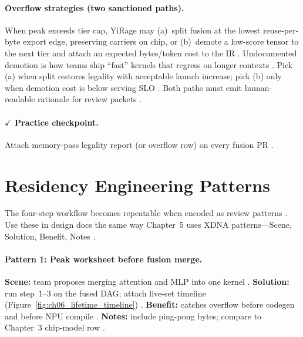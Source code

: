 \paragraph{Overflow strategies (two sanctioned paths).}
When peak exceeds tier cap, YiRage may (a)~split fusion at the lowest reuse-per-byte export edge, preserving carriers on chip, or (b)~demote a low-score tensor to the next tier and attach an expected bytes/token cost to the IR \citep{yirage2026,chen2020compilerbasedhardw}.
Undocumented demotion is how teams ship ``fast'' kernels that regress on longer contexts \citep{patel2025llminference,memoryfloor2026}.
Pick (a) when split restores legality with acceptable launch increase; pick (b) only when demotion cost is below serving SLO \citep{taxbreak2026,wu2024mirage}.
Both paths must emit human-readable rationale for review packets \citep{yirage2026,chen2020compilerbasedhardw}.

\paragraph{$\checkmark$ Practice checkpoint.}
Attach memory-pass legality report (or overflow row) on every fusion PR \citep{yirage2026,chen2020compilerbasedhardw}.

\section{Residency Engineering Patterns}
\label{sec:ch06_residency_patterns}

The four-step workflow becomes repeatable when encoded as review patterns \citep{chen2020compilerbasedhardw,yirage2026}.
Use these in design docs the same way Chapter~5 uses XDNA patterns---Scene, Solution, Benefit, Notes \citep{patel2025llminference,amd2024aie}.

\paragraph{Pattern 1: Peak worksheet before fusion merge.}
\textbf{Scene:} team proposes merging attention and MLP into one kernel \citep{taxbreak2026}.
\textbf{Solution:} run step~1--3 on the fused DAG; attach live-set timeline (Figure~\ref{fig:ch06_lifetime_timeline}) \citep{wu2024mirage,dlbook}.
\textbf{Benefit:} catches overflow before codegen and before NPU compile \citep{yirage2026,amd2024xdna}.
\textbf{Notes:} include ping-pong bytes; compare to Chapter~3 chip-model row \citep{chen2020compilerbasedhardw}.


